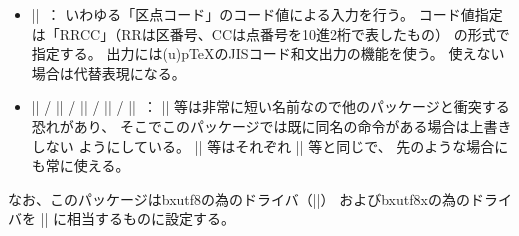 \documentclass[a4paper,uplatex]{jsarticle}
\newcommand{\Pkg}[1]{\textsf{#1}}
\newcommand{\Meta}[1]{$\langle$\mbox{}#1\mbox{}$\rangle$}
\newcommand{\Means}{~：\quad}
\providecommand{\pTeX}{p\TeX}
\begin{document}
\begin{itemize}
\item |\KI{|\Meta{コード値}|,...}|\Means
いわゆる「区点コード」のコード値による入力を行う。
コード値指定は「RRCC」（RRは区番号、CCは点番号を10進2桁で表したもの）
の形式で指定する。
出力には{(u)\pTeX}のJISコード和文出力の機能を使う。
使えない場合は代替表現になる。

\item |\bxUx| / |\bxUI| / |\bxAJ| / |\bxJI| / |\bxKI|\Means
|\Ux| 等は非常に短い名前なので他のパッケージと衝突する恐れがあり、
そこでこのパッケージでは既に同名の命令がある場合は上書きしない
ようにしている。
|\bxUx| 等はそれぞれ |\Ux| 等と同じで、
先のような場合にも常に使える。

\end{itemize}

なお、このパッケージは\Pkg{bxutf8}の為のドライバ（|\bxUHex|）
および\Pkg{bxutf8x}の為のドライバを |\Ux| に相当するものに設定する。

\end{document}

